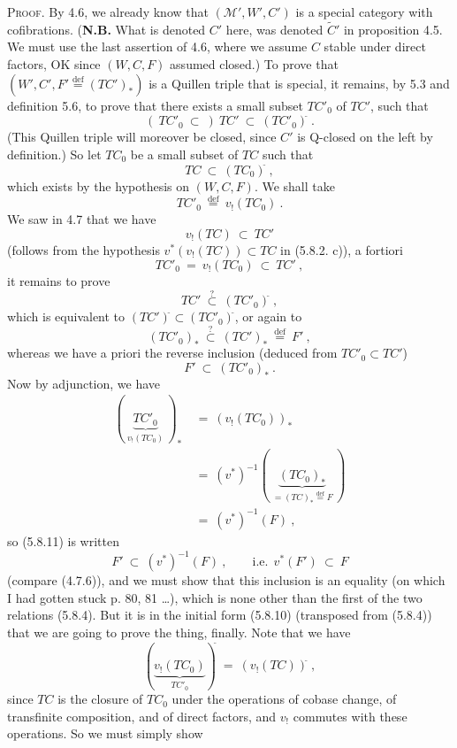 \documentclass[11pt]{article}
\newcommand{\printedpage}[1]{\marginpar{\footnotesize p.~#1}}
\newcommand{\msp}[1]{\marginpar{\footnotesize [#1]}}
\newcommand{\cl}{^{\tilde{}}}%
\newcommand{\defeq}{\overset{\text{def}}{=}}
\begin{document}
\msp{page 92}
\textsc{Proof}. By 4.6, we already know that $(\mathcal{M}', W', C')$ is a special category with cofibrations. (\textbf{N.B.} What is denoted $C'$ here, was denoted $\tilde{C}'$ in proposition 4.5. We must use the last assertion of 4.6, where we assume $C$ stable under direct factors, OK since $(W, C, F)$ assumed closed.) To prove that $(W', C', F' \defeq (TC')_*)$ is a Quillen triple
\printedpage{46}
that is special, it remains, by 5.3 and definition 5.6, to prove that there exists a small subset $TC'_0$ of $TC'$, such that
\[
(\ TC'_0 \ \subset\ )\ TC' \ \subset \ (TC'_0)\cl\ .
\tag*{(5.8.6)}
\]
(This Quillen triple will moreover be closed, since $C'$ is Q-closed on the left by definition.) So let $TC_0$ be a small subset of $TC$ such that
\[
TC \ \subset \ (TC_0)\cl\ ,
\tag*{(5.8.7)}
\]
which exists by the hypothesis on $(W, C, F)$. We shall take
\[
TC'_0 \ \defeq \ v_!(TC_0)\ .
\tag*{(5.8.8)}
\]
We saw in 4.7 that we have
\[
v_!(TC) \ \subset \ TC'
\tag*{(5.8.9)}
\]
(follows from the hypothesis $v^*(v_!(TC)) \subset TC$ in (5.8.2. c)), a fortiori
\[
TC'_0 \ = \ v_!(TC_0) \ \subset \ TC'\ ,
\]
\msp{page 93}
it remains to prove
\[
TC' \ \overset{?}{\subset} \ (TC'_0)\cl\ ,
\tag*{(5.8.10)}
\]
which is equivalent to $(TC')\cl \subset (TC'_0)\cl$, or again to
\[
(TC'_0)_* \ \overset{?}{\subset} \ (TC')_* \ \defeq \ F'\ ,
\tag*{(5.8.10 bis)}
\]
whereas we have a priori the reverse inclusion (deduced from $TC'_0 \subset TC'$)
\[
F' \ \subset \ (TC'_0)_*\ .
\tag*{(5.8.11)}
\]
Now by adjunction, we have
\[
\begin{aligned}
(\ \underbrace{TC'_0}_{v_!(TC_0)}\ )_* \ &= \ (v_!(TC_0))_*\\
&= \ (v^*)^{-1}(\ \underbrace{(TC_0)_*}_{= (TC)_* \defeq F}\ )\\
&= \ (v^*)^{-1}(F)\ ,
\end{aligned}
\]
so (5.8.11) is written
\[
F' \ \subset \ (v^*)^{-1}(F)\ , \qquad \text{i.e.}\ \ v^*(F') \ \subset \ F
\tag*{(5.8.12)}
\]
(compare (4.7.6)), and we must show that this inclusion is an equality (on which I had gotten stuck p. 80, 81 \ldots), which is none other than the first of the two relations (5.8.4). But it is in the initial form (5.8.10) (transposed from (5.8.4)) that we are going to prove the thing, finally. Note that we have
\printedpage{47}
\msp{page 94}
\[
(\underbrace{v_!(TC_0)}_{TC'_0})\cl \ = \ (v_!(TC))\cl\ ,
\]
since $TC$ is the closure of $TC_0$ under the operations of cobase change, of transfinite composition, and of direct factors, and $v_!$ commutes with these operations. So we must simply show
\end{document}
